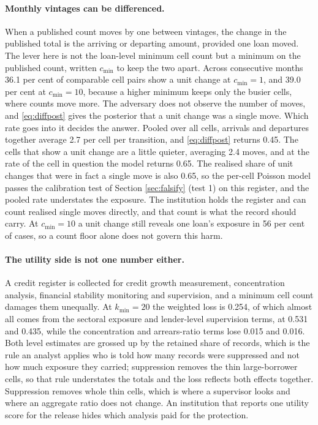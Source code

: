 \documentclass[11pt,a4paper]{article}
\theoremstyle{plain}
\theoremstyle{definition}
\theoremstyle{definition}
\theoremstyle{plain}
\begin{document}
\paragraph{Monthly vintages can be differenced.} When a published count moves by
one between vintages, the change in the published total is the arriving or
departing amount, provided one loan moved. The lever here is not the loan-level
minimum cell count but a minimum on the published count, written $c_{\min}$ to
keep the two apart. Across consecutive months 36.1 per cent of comparable cell
pairs show a unit change at $c_{\min} = 1$, and 39.0 per cent at $c_{\min} =
10$, because a higher minimum keeps only the busier cells, where counts move
more. The adversary does not observe the number of moves, and
\eqref{eq:diffpost} gives the posterior that a unit change was a single move.
Which rate goes into it decides the answer. Pooled over all cells, arrivals and
departures together average 2.7 per cell per transition, and \eqref{eq:diffpost}
returns 0.45. The cells that show a unit change are a little quieter, averaging
2.4 moves, and at the rate of the cell in question the model returns 0.65. The
realised share of unit changes that were in fact a single move is also 0.65, so
the per-cell Poisson model passes the calibration test of Section
\ref{sec:falsify} (test 1) on this register, and the pooled rate understates the
exposure. The institution holds the register and can count realised single moves
directly, and that count is what the record should carry. At $c_{\min} = 10$ a
unit change still reveals one loan's exposure in 56 per cent of cases, so a
count floor alone does not govern this harm.

\paragraph{The utility side is not one number either.} A credit register is
collected for credit growth measurement, concentration analysis, financial
stability monitoring and supervision, and a minimum cell count damages them
unequally. At $k_{\min} = 20$ the weighted loss is 0.254, of which almost all
comes from the sectoral exposure and lender-level supervision terms, at 0.531 and
0.435, while the concentration and arrears-ratio terms lose 0.015 and 0.016.
Both level estimates are grossed up by the retained share of records, which is
the rule an analyst applies who is told how many records were suppressed and not
how much exposure they carried; suppression removes the thin large-borrower
cells, so that rule understates the totals and the loss reflects both effects
together. Suppression removes whole thin cells, which is where a supervisor looks
and where an aggregate ratio does not change. An institution that reports one
utility score for the release hides which analysis paid for the protection.
\end{document}
